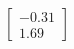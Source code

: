 \documentclass[preview]{standalone}
\begin{document}
\begin{align*}
\begin{bmatrix} -0.31 \\ 1.69 \end{bmatrix}
\end{align*}
\end{document}
